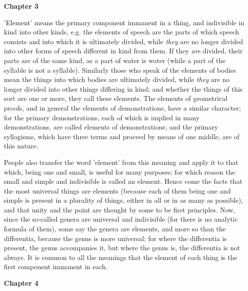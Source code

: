 \textbf{Chapter 3}

'Element' means the primary component immanent in a thing, and indivisible in kind into other kinds, e.g. the elements of speech are the parts of which speech consists and into which it is ultimately divided, while \emph{they} are no longer divided into other forms of speech different in kind from them. If they \emph{are} divided, their parts are of the same kind, as a part of water is water (while a part of the syllable is not a syllable). Similarly those who speak of the elements of bodies mean the things into which bodies are ultimately divided, while \emph{they} are no longer divided into other things differing in kind; and whether the things of this sort are one or more, they call these elements. The elements of geometrical proofs, and in general the elements of demonstrations, have a similar character; for the primary demonstrations, each of which is implied in many demonstrations, are called elements of demonstrations; and the primary syllogisms, which have three terms and proceed by means of one middle, are of this nature.

People also transfer the word 'element' from this meaning and apply it to that which, being one and small, is useful for many purposes; for which reason the small and simple and indivisible is called an element. Hence come the facts that the most universal things are elements (because each of them being one and simple is present in a plurality of things, either in all or in as many as possible), and that unity and the point are thought by some to be first principles. Now, since the so-called genera are universal and indivisible (for there is no analytic formula of them), some say the genera are elements, and more so than the differentia, because the genus is more universal; for where the differentia is present, the genus accompanies it, but where the genus is, the differentia is not always. It is common to all the meanings that the element of each thing is the first component immanent in each.

\textbf{Chapter 4}

